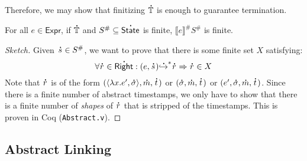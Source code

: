 \documentclass[acmsmall,screen,review]{acmart}\settopmatter{printfolios=true,printccs=false,printacmref=false}
\theoremstyle{acmdefinition}
\newcommand*{\A}[1]{\overset{\,_{\mbox{\Large .}}}{#1}}
\newcommand*{\Abs}[1]{{#1}^{\#}}
\newcommand*{\Expr}{\mathsf{Expr}}
\newcommand*{\Time}{\mathbb{T}}
\newcommand*{\ctx}{\sigma}
\newcommand*{\mem}{m}
\newcommand*{\Right}{\mathsf{Right}}
\newcommand*{\rightst}{r}
\newcommand*{\State}{\mathsf{State}}
\newcommand*{\semarrow}{\hookrightarrow}
\newcommand*{\sembracket}[1]{\lBrack{#1}\rBrack}
\begin{document}
Therefore, we may show that finitizing $\A\Time$ is enough to guarantee termination.
\begin{theorem}[Finiteness]\label{thm:absfinite}
  For all $e\in\Expr$, if $\A\Time$ and $\Abs{S}\subseteq\A\State$ is finite, $\Abs{\sembracket{e}}\Abs{S}$ is finite.
\end{theorem}
\begin{proof}[Sketch]
  Given $\A{s}\in\Abs{S}$, we want to prove that there is some finite set $X$ satisfying:
  \[\forall \A\rightst\in\A\Right:(e,\A{s}){\A\semarrow}^*\A\rightst\Rightarrow\A\rightst\in X\]
  Note that $\A\rightst$ is of the form $(\langle\lambda x.e',\A{\ctx}\rangle,\A\mem,\A{t})$ or $(\A{\ctx},\A\mem,\A{t})$ or $(e',\A{\ctx},\A\mem,\A{t})$.
  Since there is a finite number of abstract timestamps, we only have to show that there is a finite number of \emph{shapes} of $\A\rightst$ that is stripped of the timestamps.
  This is proven in Coq (\texttt{Abstract.v}).
\end{proof}
\subsection{Abstract Linking}
\end{document}
